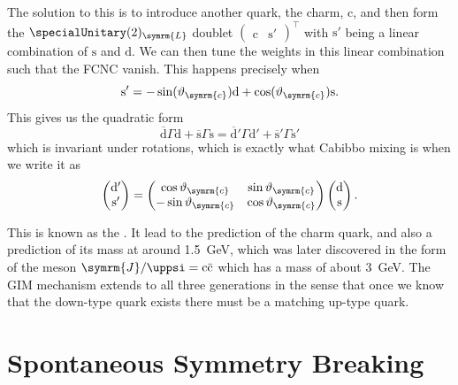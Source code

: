 \documentclass[fleqn]{NotesClass}
\newcommand{\Pparticle}[1]{\mathrm{#1}}
\newcommand{\Pd}{\ensuremath{\Pparticle{d}}}
\newcommand{\Ps}{\ensuremath{\Pparticle{s}}}
\newcommand{\Pc}{\ensuremath{\Pparticle{c}}}
\newcommand{\PJpsi}{\ensuremath{\symrm{J}/\uppsi}}
\newcommand{\APantiparticle}[1]{\bar{#1}}
\newcommand{\APc}{\ensuremath{\APantiparticle{\Pparticle{c}}}}
\newcommand{\diracadjoint}[1]{\overbar{#1}}
\newcommand{\Left}{\symrm{L}}
\newcommand{\trans}{\top}
\newcommand{\cabibboangle}{\vartheta_{\symrm{c}}}
\begin{document}
    The solution to this is to introduce another quark, the charm, \(\Pc\), and then form the \(\specialUnitary(2)_{\Left}\) doublet \(\begin{pmatrix} \Pc & \Ps' \end{pmatrix}^\trans\) with \(\Ps'\) being a linear combination of \(\Ps\) and \(\Pd\).
    We can then tune the weights in this linear combination such that the FCNC vanish.
    This happens precisely when
    \begin{equation}
        \Ps' = -\sin(\cabibboangle)\Pd + \cos(\cabibboangle)\Ps.
    \end{equation}
    This gives us the quadratic form
    \begin{equation}
        \diracadjoint{\Pd} \Gamma \Pd + \diracadjoint{\Ps} \Gamma \Ps = \diracadjoint{\Pd}'\Gamma \Pd' + \diracadjoint{\Ps}' \Gamma \Ps'
    \end{equation}
    which is invariant under rotations, which is exactly what Cabibbo mixing is when we write it as
    \begin{equation}
        \begin{pmatrix}
            \Pd'\\ \Ps'
        \end{pmatrix}
        =
        \begin{pmatrix}
            \cos\cabibboangle & \sin\cabibboangle\\
            -\sin\cabibboangle & \cos\cabibboangle
        \end{pmatrix}
        \begin{pmatrix}
            \Pd\\ \Ps
        \end{pmatrix}
        .
    \end{equation}

    This is known as the .
    It lead to the prediction of the charm quark, and also a prediction of its mass at around \qty{1.5}{\giga\electronvolt}, which was later discovered in the form of the meson \(\PJpsi = \Pc\APc\) which has a mass of about \qty{3}{\giga\electronvolt}.
    The GIM mechanism extends to all three generations in the sense that once we know that the down-type quark exists there must be a matching up-type quark.
    
    \chapter{Spontaneous Symmetry Breaking}
\end{document}
